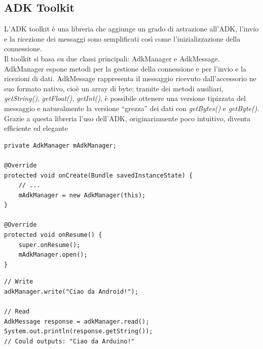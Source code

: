 \subsection {ADK Toolkit}
L'ADK toolkit è una libreria che aggiunge un grado di astrazione all'ADK, l'invio
 e la ricezione dei messaggi sono semplificati così come l'inizializzazione della 
 connessione.\\
Il toolkit si basa su due classi principali: AdkManager e AdkMessage.	\\	
AdkManager espone metodi per la gestione della connessione e per l'invio e la 
ricezioni di dati. AdkMessage rappresenta il messaggio ricevuto dall'accessorio 
ne suo formato nativo, cioè un array di byte; tramite dei metodi ausiliari, 
\textit{getString()}, \textit{getFloat()}, \textit{getInt()}, è possibile 
ottenere una versione tipizzata del messaggio e naturalmente la versione ``grezza'' 
dei dati con \textit{getBytes()} e \textit{getByte()}.\\
Grazie a questa libreria l'uso dell'ADK, originariamente poco intuitivo, diventa 
efficiente ed elegante
\begin{lstlisting}[caption=Inizializzazione della connessione con l'accessorio]
private AdkManager mAdkManager;

@Override
protected void onCreate(Bundle savedInstanceState) {
    // ...
    mAdkManager = new AdkManager(this);
}

@Override
protected void onResume() {
    super.onResume();
    mAdkManager.open();
}
\end{lstlisting}
\begin{lstlisting}[caption=Lettura e scrittura dati]
// Write
adkManager.write("Ciao da Android!");

// Read
AdkMessage response = adkManager.read();
System.out.println(response.getString());
// Could outputs: "Ciao da Arduino!"
\end{lstlisting}